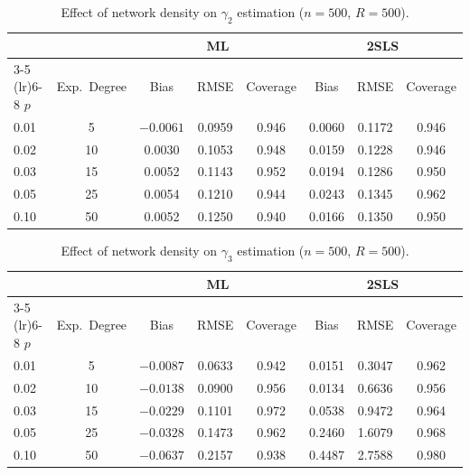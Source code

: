 \begin{table}[htbp]
\centering
\caption[Effect of network density on $\gamma_2$ estimation]{Effect of network density on $\gamma_2$ estimation ($n = 500$, $R = 500$).}
\label{tab:mc_density_g2}
\begin{tabular}{lccccccc}
\toprule
 & & \multicolumn{3}{c}{ML} & \multicolumn{3}{c}{2SLS} \\
\cmidrule(lr){3-5} \cmidrule(lr){6-8}
$p$ & Exp.\ Degree & Bias & RMSE & Coverage & Bias & RMSE & Coverage \\
\midrule
0.01 & 5 & $-0.0061$ & 0.0959 & 0.946 & 0.0060 & 0.1172 & 0.946 \\
0.02 & 10 & 0.0030 & 0.1053 & 0.948 & 0.0159 & 0.1228 & 0.946 \\
0.03 & 15 & 0.0052 & 0.1143 & 0.952 & 0.0194 & 0.1286 & 0.950 \\
0.05 & 25 & 0.0054 & 0.1210 & 0.944 & 0.0243 & 0.1345 & 0.962 \\
0.10 & 50 & 0.0052 & 0.1250 & 0.940 & 0.0166 & 0.1350 & 0.950 \\
\bottomrule
\end{tabular}
\end{table}

\begin{table}[htbp]
\centering
\caption[Effect of network density on $\gamma_3$ estimation]{Effect of network density on $\gamma_3$ estimation ($n = 500$, $R = 500$).}
\label{tab:mc_density_g3}
\begin{tabular}{lccccccc}
\toprule
 & & \multicolumn{3}{c}{ML} & \multicolumn{3}{c}{2SLS} \\
\cmidrule(lr){3-5} \cmidrule(lr){6-8}
$p$ & Exp.\ Degree & Bias & RMSE & Coverage & Bias & RMSE & Coverage \\
\midrule
0.01 & 5 & $-0.0087$ & 0.0633 & 0.942 & 0.0151 & 0.3047 & 0.962 \\
0.02 & 10 & $-0.0138$ & 0.0900 & 0.956 & 0.0134 & 0.6636 & 0.956 \\
0.03 & 15 & $-0.0229$ & 0.1101 & 0.972 & 0.0538 & 0.9472 & 0.964 \\
0.05 & 25 & $-0.0328$ & 0.1473 & 0.962 & 0.2460 & 1.6079 & 0.968 \\
0.10 & 50 & $-0.0637$ & 0.2157 & 0.938 & 0.4487 & 2.7588 & 0.980 \\
\bottomrule
\end{tabular}
\end{table}


